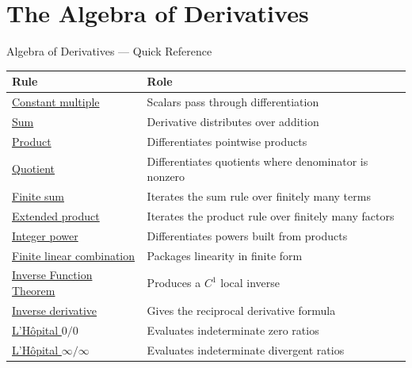 \section{The Algebra of Derivatives}

\begin{toolkitbox}{Algebra of Derivatives --- Quick Reference}
\small
\begin{tabular}{l l}
\toprule
\textbf{Rule} & \textbf{Role} \\
\midrule
\hyperref[thm:constant-multiple-rule]{Constant multiple} & Scalars pass through differentiation \\
\hyperref[thm:sum-rule]{Sum} & Derivative distributes over addition \\
\hyperref[thm:product-rule]{Product} & Differentiates pointwise products \\
\hyperref[thm:quotient-rule]{Quotient} & Differentiates quotients where denominator is nonzero \\
\hyperref[cor:finite-sum-rule]{Finite sum} & Iterates the sum rule over finitely many terms \\
\hyperref[cor:extended-product-rule]{Extended product} & Iterates the product rule over finitely many factors \\
\hyperref[cor:power-rule-special-case]{Integer power} & Differentiates powers built from products \\
\hyperref[thm:finite-linear-combination-rule]{Finite linear combination} & Packages linearity in finite form \\
\hyperref[thm:inverse-function-theorem-one-variable]{Inverse Function Theorem} & Produces a \(C^1\) local inverse \\
\hyperref[cor:inverse-function-derivative]{Inverse derivative} & Gives the reciprocal derivative formula \\
\hyperref[thm:lhopital-zero-over-zero]{L'H\^{o}pital \(0/0\)} & Evaluates indeterminate zero ratios \\
\hyperref[thm:lhopital-infinity-over-infinity]{L'H\^{o}pital \(\infty/\infty\)} & Evaluates indeterminate divergent ratios \\
\bottomrule
\end{tabular}
\end{toolkitbox}





